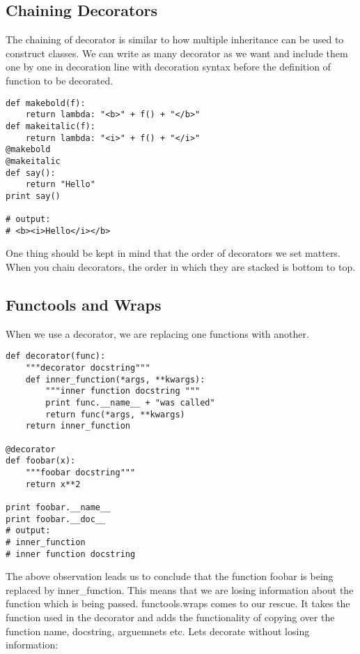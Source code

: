 \subsection{Chaining Decorators}
The chaining of decorator is similar to how multiple inheritance can be used to construct classes. We can write as many decorator as we want and include them one by one in decoration line with decoration syntax before the definition of function to be decorated.

\begin{verbatim}
def makebold(f):
    return lambda: "<b>" + f() + "</b>"
def makeitalic(f):
    return lambda: "<i>" + f() + "</i>"
@makebold
@makeitalic
def say():
    return "Hello"
print say()

# output:
# <b><i>Hello</i></b>
\end{verbatim}
One thing should be kept in mind that the order of decorators we set matters. When you chain decorators, the order in which they are stacked is bottom to top.

\subsection{Functools and Wraps}
When we use a decorator, we are replacing one functions with another.

\begin{verbatim}
def decorator(func):
    """decorator docstring"""
    def inner_function(*args, **kwargs):
        """inner function docstring """
        print func.__name__ + "was called"
        return func(*args, **kwargs)
    return inner_function

@decorator
def foobar(x):
    """foobar docstring"""
    return x**2

print foobar.__name__
print foobar.__doc__
# output:
# inner_function
# inner function docstring
\end{verbatim}

The above observation leads us to conclude that the function foobar is being replaced by inner\_function. This means that we are losing information about the function which is being passed. functools.wraps comes to our rescue. It takes the function used in the decorator and adds the functionality of copying over the function name, docstring, arguemnets etc. Lets decorate without losing information:

